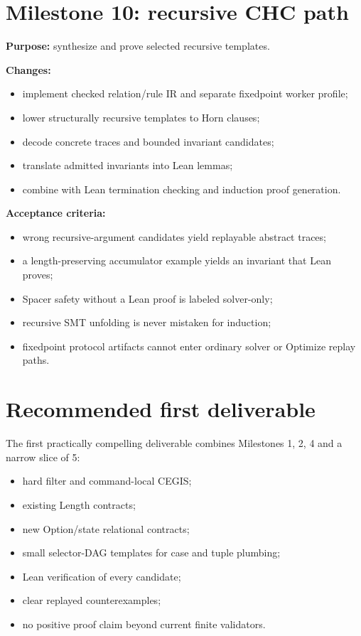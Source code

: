 \documentclass[11pt,oneside]{report}
\begin{document}
\section{Milestone 10: recursive CHC path}

\textbf{Purpose:} synthesize and prove selected recursive templates.

\textbf{Changes:}

\begin{itemize}[leftmargin=2em]
\item implement checked relation/rule IR and separate fixedpoint worker profile;
\item lower structurally recursive templates to Horn clauses;
\item decode concrete traces and bounded invariant candidates;
\item translate admitted invariants into Lean lemmas;
\item combine with Lean termination checking and induction proof generation.
\end{itemize}

\textbf{Acceptance criteria:}

\begin{itemize}[leftmargin=2em]
\item wrong recursive-argument candidates yield replayable abstract traces;
\item a length-preserving accumulator example yields an invariant that Lean proves;
\item Spacer safety without a Lean proof is labeled solver-only;
\item recursive SMT unfolding is never mistaken for induction;
\item fixedpoint protocol artifacts cannot enter ordinary solver or Optimize replay paths.
\end{itemize}

\section{Recommended first deliverable}

The first practically compelling deliverable combines Milestones 1, 2, 4 and a narrow slice of 5:

\begin{itemize}[leftmargin=2em]
\item hard filter and command-local CEGIS;
\item existing Length contracts;
\item new Option/state relational contracts;
\item small selector-DAG templates for case and tuple plumbing;
\item Lean verification of every candidate;
\item clear replayed counterexamples;
\item no positive proof claim beyond current finite validators.
\end{itemize}
\end{document}
